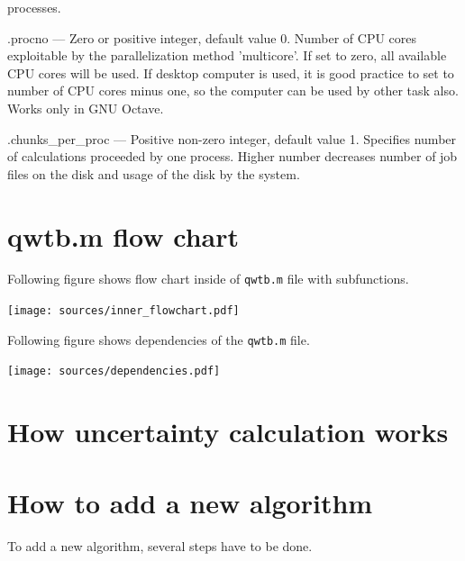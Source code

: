 \documentclass[12pt,a4paper,oneside]{report} %
\def\octave{{\sc GNU Octave}\xspace}
\begin{document}
\begin{tightdesc}
        processes.
        \item [\textsf{.procno}] ---  Zero or positive integer, default value 0. Number of CPU cores exploitable
        by the parallelization method \textsf{'multicore'}. If set to zero, all available CPU cores will be used. If
        desktop computer is used, it is good practice to set to number of CPU cores minus one, so
        the computer can be used by other task also. 
        Works only in \octave.
        \item [\textsf{.chunks\_per\_proc}] --- Positive non-zero integer,
        default value 1. Specifies number of calculations proceeded by one
        process. Higher number decreases number of job files on the disk and
        usage of the disk by the system.
\end{tightdesc}



\section{qwtb.m flow chart} %
Following figure shows flow chart inside of {\tt qwtb.m} file with subfunctions.
\begin{center}
        \texttt{[image: sources/inner\_flowchart.pdf]}
\end{center}

\newpage
Following figure shows dependencies of the {\tt qwtb.m} file.
\begin{center}
        \texttt{[image: sources/dependencies.pdf]}
\end{center}


\section{How uncertainty calculation works} %


\section{How to add a new algorithm} %
To add a new algorithm, several steps have to be done.
\end{document}
